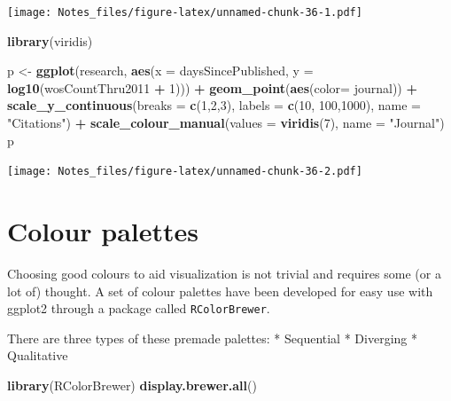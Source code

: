 \documentclass[
]{book}
\newenvironment{Shaded}{\begin{snugshade}}{\end{snugshade}}
\newcommand{\DataTypeTok}[1]{\textcolor[rgb]{0.13,0.29,0.53}{#1}}
\newcommand{\DecValTok}[1]{\textcolor[rgb]{0.00,0.00,0.81}{#1}}
\newcommand{\KeywordTok}[1]{\textcolor[rgb]{0.13,0.29,0.53}{\textbf{#1}}}
\newcommand{\NormalTok}[1]{#1}
\newcommand{\OperatorTok}[1]{\textcolor[rgb]{0.81,0.36,0.00}{\textbf{#1}}}
\newcommand{\StringTok}[1]{\textcolor[rgb]{0.31,0.60,0.02}{#1}}
\begin{document}
\texttt{[image: Notes\_files/figure-latex/unnamed-chunk-36-1.pdf]}

\begin{Shaded}
\begin{Highlighting}[]
\KeywordTok{library}\NormalTok{(viridis)}

\NormalTok{p <-}\StringTok{ }\KeywordTok{ggplot}\NormalTok{(research, }\KeywordTok{aes}\NormalTok{(}\DataTypeTok{x =}\NormalTok{ daysSincePublished, }
                          \DataTypeTok{y =} \KeywordTok{log10}\NormalTok{(wosCountThru2011 }\OperatorTok{+}\StringTok{ }\DecValTok{1}\NormalTok{))) }\OperatorTok{+}\StringTok{ }
\StringTok{  }\KeywordTok{geom_point}\NormalTok{(}\KeywordTok{aes}\NormalTok{(}\DataTypeTok{color=}\NormalTok{ journal)) }\OperatorTok{+}
\StringTok{  }\KeywordTok{scale_y_continuous}\NormalTok{(}\DataTypeTok{breaks =} \KeywordTok{c}\NormalTok{(}\DecValTok{1}\NormalTok{,}\DecValTok{2}\NormalTok{,}\DecValTok{3}\NormalTok{), }\DataTypeTok{labels =} \KeywordTok{c}\NormalTok{(}\DecValTok{10}\NormalTok{, }\DecValTok{100}\NormalTok{,}\DecValTok{1000}\NormalTok{), }\DataTypeTok{name =} \StringTok{"Citations"}\NormalTok{) }\OperatorTok{+}
\StringTok{  }\KeywordTok{scale_colour_manual}\NormalTok{(}\DataTypeTok{values =} \KeywordTok{viridis}\NormalTok{(}\DecValTok{7}\NormalTok{), }\DataTypeTok{name =} \StringTok{"Journal"}\NormalTok{)}
\NormalTok{p}
\end{Highlighting}
\end{Shaded}

\texttt{[image: Notes\_files/figure-latex/unnamed-chunk-36-2.pdf]}

\hypertarget{colour-palettes}{%
\section{Colour palettes}\label{colour-palettes}}

Choosing good colours to aid visualization is not trivial and requires some (or a lot of) thought. A set of colour palettes have been developed for easy use with ggplot2 through a package called \texttt{RColorBrewer}.

There are three types of these premade palettes:
* Sequential
* Diverging
* Qualitative

\begin{Shaded}
\begin{Highlighting}[]
\KeywordTok{library}\NormalTok{(RColorBrewer)}
\KeywordTok{display.brewer.all}\NormalTok{()}
\end{Highlighting}
\end{Shaded}
\end{document}
